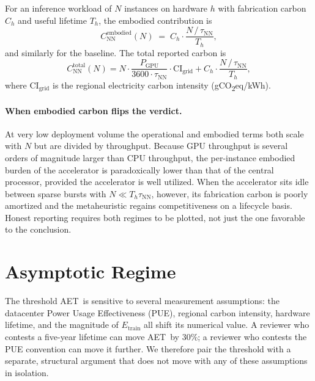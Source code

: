 \documentclass[11pt]{article}
\newcommand{\AET}{AET}
\begin{document}


For an inference workload of \(N\) instances on hardware \(h\) with fabrication carbon \(C_h\) and useful lifetime \(T_h\), the embodied contribution is
\begin{equation}
  C^\text{embodied}_\text{NN}(N) \;=\;
  C_h \cdot \frac{N \,/\, \tau_\text{NN}}{T_h},
\end{equation}
and similarly for the baseline. The total reported carbon is
\begin{equation}
  C^\text{total}_\text{NN}(N)
   = N \cdot \frac{P_\text{GPU}}{3600 \cdot \tau_\text{NN}}\cdot \mathrm{CI}_\text{grid}
   + C_h \cdot \frac{N \,/\, \tau_\text{NN}}{T_h},
\end{equation}
where \(\mathrm{CI}_\text{grid}\) is the regional electricity carbon intensity (gCO\textsubscript{2}eq/kWh).

\paragraph{When embodied carbon flips the verdict.} At very low
deployment volume the operational and embodied terms both scale with \(N\) but are divided by throughput. Because GPU throughput is several orders of magnitude larger than CPU throughput, the per-instance embodied burden of the accelerator is paradoxically lower than that of the central processor, provided the accelerator is well utilized. When the accelerator sits idle between sparse bursts with \(N \ll T_h \tau_\text{NN}\), however, its fabrication carbon is poorly amortized and the metaheuristic regains competitiveness on a lifecycle basis. Honest reporting requires both regimes to be plotted, not just the one favorable to the conclusion.

\section{Asymptotic Regime}
\label{sec:asymp}

The threshold \AET\ is sensitive to several measurement assumptions: the datacenter Power Usage Effectiveness (PUE), regional carbon intensity, hardware lifetime, and the magnitude of \(E_\text{train}\) all shift its numerical value. A reviewer who contests a five-year lifetime can move \AET\ by 30\%; a reviewer who contests the PUE convention can move it further. We therefore pair the threshold with a separate, structural argument that does not move with any of these assumptions in isolation.
\end{document}
